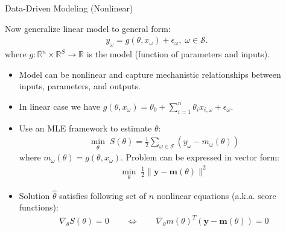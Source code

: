 \documentclass[9pt]{beamer}
\begin{document}
%
\begin{frame}{Data-Driven Modeling (Nonlinear)}

Now generalize linear model to general form:
\begin{align*}
y_\omega=g(\theta, x_{\omega}) + \epsilon_\omega,\; \omega \in \mathcal{S}.
\end{align*}
where $g:\mathbb{R}^{n}\times \mathbb{R}^S\to \mathbb{R}$ is the model (function of parameters and inputs). 

\begin{itemize}
\setlength{\itemsep}{5pt}
\item Model can be nonlinear and capture mechanistic relationships between inputs, parameters, and outputs. 

\item In linear case we have $g(\theta,x_\omega)=\theta_0+\sum_{i=1}^n\theta_i x_{i,\omega} + \epsilon_\omega$. 

\item Use an MLE framework to estimate $\theta$:
\begin{align*}
\min_{\theta} \; S(\theta)=\frac{1}{2}\sum_{\omega \in \mathcal{S}}(y_\omega - m_\omega(\theta))
\end{align*}
where $m_\omega(\theta)=g(\theta, x_{\omega})$.  Problem can be expressed in vector form:
\begin{align*}
\min_{\theta} \; \frac{1}{2}\|\mathbf{y} - \mathbf{m}(\theta)\|^2
\end{align*}
\item Solution $\hat{\theta}$ satisfies following set of $n$ nonlinear equations (a.k.a. score functions):
\begin{align*}
\nabla_\theta S(\theta)=0\qquad \Longleftrightarrow\qquad  \nabla_\theta m(\theta)^T(\mathbf{y}-\mathbf{m}(\theta))=0
\end{align*}
\end{itemize}
\end{frame}
\end{document}

